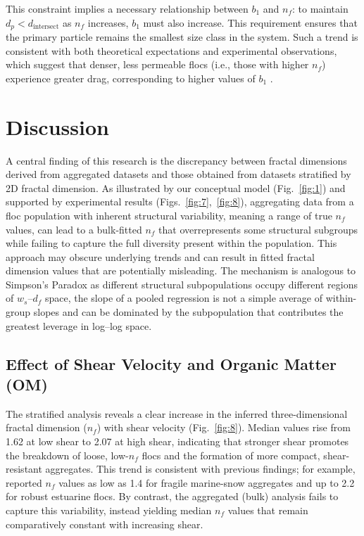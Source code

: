 \documentclass{agujournal2019}
\providecommand{\DIFadd}[1]{{\protect\color{blue}#1}}
\begin{document}
This constraint implies a necessary relationship between $b_1$ and $n_f$: to maintain $d_p < d_{\text{intersect}}$ as $n_f$ increases, $b_1$ must also increase. This requirement ensures that the primary particle remains the smallest size class in the system. Such a trend is consistent with both theoretical expectations and experimental observations, which suggest that denser, less permeable flocs (i.e., those with higher $n_f$) experience greater drag, corresponding to higher values of $b_1$ \cite{strom2011explicit}.

\section{Discussion}
A central finding of this research is the discrepancy between fractal dimensions derived from aggregated datasets and those obtained from datasets stratified by 2D fractal dimension. As illustrated by our conceptual model (Fig.~\ref{fig:1}) and supported by experimental results (Figs.~\ref{fig:7},~\ref{fig:8}), aggregating data from a floc population with inherent structural variability, meaning a range of true \( n_f \) values, can lead to a bulk-fitted \( n_f \) that overrepresents some structural subgroups while failing to capture the full diversity present within the population. This approach may obscure underlying trends and can result in fitted fractal dimension values that are potentially misleading. \DIFadd{ The mechanism is analogous to Simpson’s Paradox as different structural subpopulations occupy different regions of $w_s$--$d_f$ space, the slope of a pooled regression is not a simple average of within-group slopes and can be dominated by the subpopulation that contributes the greatest leverage in log--log space.}

\subsection{Effect of Shear Velocity and Organic Matter (OM)}

The stratified analysis reveals a clear increase in the inferred three-dimensional fractal dimension (\(n_f\)) with shear velocity (Fig.~\ref{fig:8}). Median values rise from 1.62 at low shear to 2.07 at high shear, indicating that stronger shear promotes the breakdown of loose, low-\(n_f\) flocs and the formation of more compact, shear-resistant aggregates. This trend is consistent with previous findings; for example,  reported \(n_f\) values as low as 1.4 for fragile marine-snow aggregates and up to 2.2 for robust estuarine flocs. By contrast, the aggregated (bulk) analysis fails to capture this variability, instead yielding median \(n_f\) values that remain comparatively constant with increasing shear.
\end{document}

